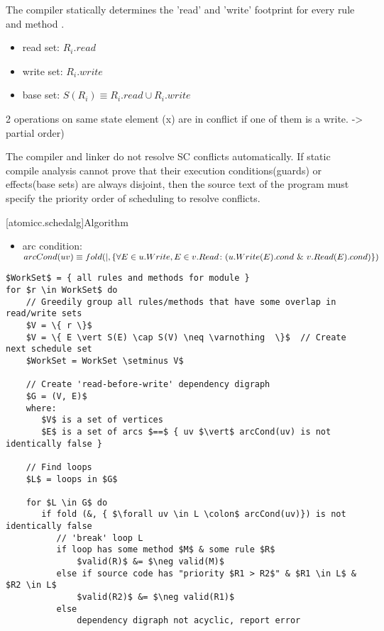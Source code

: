 The compiler statically determines the 'read' and 'write'
footprint for every rule and method \cite[Sec.~10.1.2]{OV11} \cite{doi:10.1137/0213032}.
\begin{itemize}
\item read set: $R_{i}.read$
\item write set: $R_{i}.write$
\item base set: $S(R_{i}) \equiv R_{i}.read \cup R_{i}.write$
\end{itemize}
\cite[Sec.~10.1.2]{OV11}
\cite[Sec.~11.1]{OV11}  2 operations on same state element (x) are in conflict if
one of them is a write. -> partial order)

The compiler and linker do not resolve SC conflicts automatically.
If static compile analysis cannot prove that their execution conditions(guards) or
effects(base sets) are always disjoint,
then the source text of the program must specify the priority order of scheduling
to resolve conflicts.

[atomicc.schedalg]{Algorithm}
\begin{itemize}
\item arc condition: $arcCond(uv) \equiv
\newline
      fold (|, \{ \forall E \in u.Write, E \in v.Read \colon (u.Write(E).cond\ \&\ v.Read(E).cond) \})$
\end{itemize}

\begin{lstlisting}[mathescape=true]
$WorkSet$ = { all rules and methods for module }
for $r \in WorkSet$ do
    // Greedily group all rules/methods that have some overlap in read/write sets
    $V = \{ r \}$
    $V = \{ E \vert S(E) \cap S(V) \neq \varnothing  \}$  // Create next schedule set
    $WorkSet = WorkSet \setminus V$

    // Create 'read-before-write' dependency digraph
    $G = (V, E)$
    where: 
       $V$ is a set of vertices
       $E$ is a set of arcs $==$ { uv $\vert$ arcCond(uv) is not identically false }

    // Find loops
    $L$ = loops in $G$

    for $L \in G$ do
       if fold (&, { $\forall uv \in L \colon$ arcCond(uv)}) is not identically false
          // 'break' loop L
          if loop has some method $M$ & some rule $R$
              $valid(R)$ &= $\neg valid(M)$
          else if source code has "priority $R1 > R2$" & $R1 \in L$ & $R2 \in L$
              $valid(R2)$ &= $\neg valid(R1)$
          else
              dependency digraph not acyclic, report error
\end{lstlisting}

